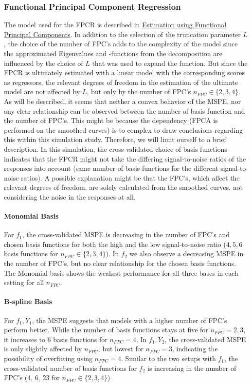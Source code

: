 \documentclass[11pt,twoside,a4paper]{article}
\begin{document}
	\subsubsection{Functional Principal Component Regression}
		The model used for the FPCR is described in \hyperref[fpc_exp_transf]{Estimation using Functional Principal Components}. In addition to the selection of the truncation parameter $L$, the choice of the number of FPC's adds to the complexity of the model since the approximated Eigenvalues and -functions from the decomposition are influenced by the choice of $L$ that was used to expand the function. But since the FPCR is ultimately estimated with a linear model with the corresponding scores as regressors, the relevant degrees of freedom in the estimation of the ultimate model are not affected by $L$, but only by the number of FPC's $n_{FPC} \in \{2, 3, 4 \}$. As will be described, it seems that neither a convex behavior of the MSPE, nor any clear relationship can be observed between the number of basis function and the number of FPC's. This might be because the dependency (FPCA is performed on the smoothed curves) is to complex to draw conclusions regarding this within this simulation study. Therefore, we will limit ourself to a brief description. In this simulation, the cross-validated choice of basis functions indicates that the FPCR might not take the differing signal-to-noise ratios of the responses into account (same number of basis functions for the different signal-to-noise ratios). A possible explanation might be that the FPC's, which affect the relevant degrees of freedom, are solely calculated from the smoothed curves, not considering the noise in the responses at all.
	
	\paragraph{Monomial Basis}
	For $f_1$, the cross-validated MSPE is decreasing in the number of FPC's and chosen basis functions for both the high and the low signal-to-noise ratio ($4,5,6$ basis functions for $n_{FPC} \in \{2, 3, 4 \}$). In  $f_2$ we also observe a decreasing MSPE in the number of FPC's, but no clear relationship for the chosen basis functions. The Monomial basis shows the weakest performance for all three bases in each setting for all $n_{FPC}$.
	\vspace{-0.2cm}
	
	\paragraph{B-spline Basis}
	For $f_1,Y_1$, the MSPE suggests that models with a higher number of FPC's perform better. While the number of basis functions stays at five for $n_{FPC} = 2,3$, it increases to 6 basis functions for $n_{FPC} = 4$. In $f_1,Y_2$, the cross-validated MSPE is only slightly affected by $n_{FPC}$, but lowest for $n_{FPC} = 3$, indicating the possibility of overfitting using $n_{FPC} = 4$. Similar to the two setups with $f_1$, the cross-validated number of basis functions for $f_2$ is increasing in the number of FPC's (4, 6, 23 for $n_{FPC} \in \{2, 3, 4 \}$)
	\vspace{-0.2cm}
	
\end{document}
